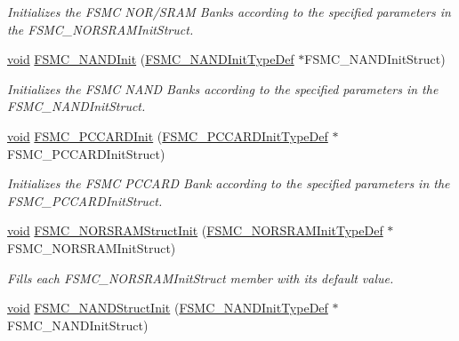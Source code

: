 \begin{DoxyCompactItemize}
\begin{DoxyCompactList}\small\item\em Initializes the F\+S\+MC N\+O\+R/\+S\+R\+AM Banks according to the specified parameters in the F\+S\+M\+C\+\_\+\+N\+O\+R\+S\+R\+A\+M\+Init\+Struct. \end{DoxyCompactList}\item 
\hyperlink{usb__devapi_8h_afabf60e7f57651d6d595a02c75f07cd0}{void} \hyperlink{group___f_s_m_c___private___functions_ga9f81ccc4e126c11f1eb33077b1a68e6f}{F\+S\+M\+C\+\_\+\+N\+A\+N\+D\+Init} (\hyperlink{struct_f_s_m_c___n_a_n_d_init_type_def}{F\+S\+M\+C\+\_\+\+N\+A\+N\+D\+Init\+Type\+Def} $\ast$F\+S\+M\+C\+\_\+\+N\+A\+N\+D\+Init\+Struct)
\begin{DoxyCompactList}\small\item\em Initializes the F\+S\+MC N\+A\+ND Banks according to the specified parameters in the F\+S\+M\+C\+\_\+\+N\+A\+N\+D\+Init\+Struct. \end{DoxyCompactList}\item 
\hyperlink{usb__devapi_8h_afabf60e7f57651d6d595a02c75f07cd0}{void} \hyperlink{group___f_s_m_c___private___functions_gacee1351363e7700a296faa1734a910aa}{F\+S\+M\+C\+\_\+\+P\+C\+C\+A\+R\+D\+Init} (\hyperlink{struct_f_s_m_c___p_c_c_a_r_d_init_type_def}{F\+S\+M\+C\+\_\+\+P\+C\+C\+A\+R\+D\+Init\+Type\+Def} $\ast$F\+S\+M\+C\+\_\+\+P\+C\+C\+A\+R\+D\+Init\+Struct)
\begin{DoxyCompactList}\small\item\em Initializes the F\+S\+MC P\+C\+C\+A\+RD Bank according to the specified parameters in the F\+S\+M\+C\+\_\+\+P\+C\+C\+A\+R\+D\+Init\+Struct. \end{DoxyCompactList}\item 
\hyperlink{usb__devapi_8h_afabf60e7f57651d6d595a02c75f07cd0}{void} \hyperlink{group___f_s_m_c___private___functions_gaf33e6dfc34f62d16a0cb416de9e83d28}{F\+S\+M\+C\+\_\+\+N\+O\+R\+S\+R\+A\+M\+Struct\+Init} (\hyperlink{struct_f_s_m_c___n_o_r_s_r_a_m_init_type_def}{F\+S\+M\+C\+\_\+\+N\+O\+R\+S\+R\+A\+M\+Init\+Type\+Def} $\ast$F\+S\+M\+C\+\_\+\+N\+O\+R\+S\+R\+A\+M\+Init\+Struct)
\begin{DoxyCompactList}\small\item\em Fills each F\+S\+M\+C\+\_\+\+N\+O\+R\+S\+R\+A\+M\+Init\+Struct member with its default value. \end{DoxyCompactList}\item 
\hyperlink{usb__devapi_8h_afabf60e7f57651d6d595a02c75f07cd0}{void} \hyperlink{group___f_s_m_c___private___functions_ga8283ad94ad8e83d49d5b77d1c7e17862}{F\+S\+M\+C\+\_\+\+N\+A\+N\+D\+Struct\+Init} (\hyperlink{struct_f_s_m_c___n_a_n_d_init_type_def}{F\+S\+M\+C\+\_\+\+N\+A\+N\+D\+Init\+Type\+Def} $\ast$F\+S\+M\+C\+\_\+\+N\+A\+N\+D\+Init\+Struct)

\end{DoxyCompactItemize}
